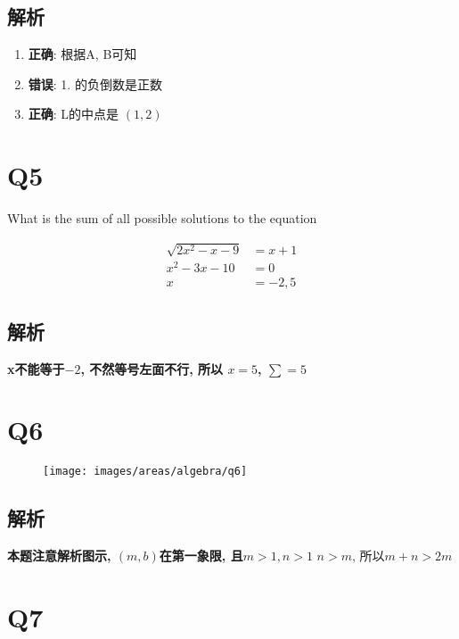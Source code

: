   \subsection{解析}

    \begin{enumerate}
      \item \textbf{正确}: 根据A, B可知
      \item \textbf{错误}: 1. 的负倒数是正数
      \item \textbf{正确}: L的中点是 $ (1, 2) $
    \end{enumerate}

\section{Q5}

  What is the sum of all possible solutions to the equation

  \begin{align*}
    \sqrt{2x^{2} - x - 9} &= x + 1 \\
    x^{2} - 3x - 10 &= 0 \\
    x &= -2, 5
  \end{align*}

  \subsection{解析}

    \textbf{x不能等于$ -2 $, 不然等号左面不行, 所以 $ x = 5 $, $ \sum = 5 $}

\section{Q6}

  \begin{figure}[H]
    \centering
    \texttt{[image: images/areas/algebra/q6]}
  \end{figure}

  \subsection{解析}

    \textbf{本题注意解析图示, $ \left( m, b \right) $在第一象限, 且$ m > 1, n > 1 $}
    $ n > m $, 所以$ m + n > 2m $

\section{Q7}

